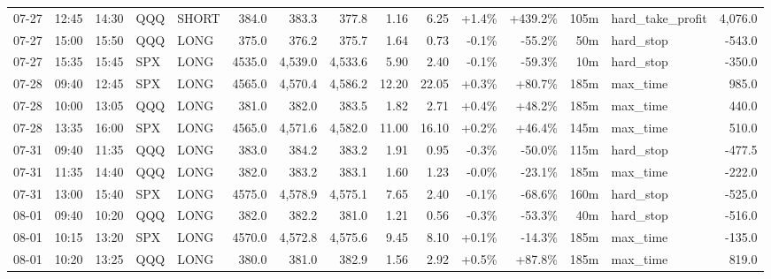 \documentclass[11pt,a4paper,twoside]{article}
\begin{document}
\begin{landscape}
\begin{center}
\begin{longtable}{>{\color{txtmain}}l l l l l r r r r r r r r >{\color{txtmain}}l r}
07-27 & 12:45 & 14:30 & QQQ & SHORT & 384.0 & 383.3 & 377.8 & 1.16 & 6.25 & \textcolor{wingreen}{+1.4\%} & \textcolor{wingreen}{+439.2\%} & 105m & hard\_take\_profit & \textcolor{wingreen}{4,076.0} \\
07-27 & 15:00 & 15:50 & QQQ & LONG & 375.0 & 376.2 & 375.7 & 1.64 & 0.73 & \textcolor{lossred}{-0.1\%} & \textcolor{lossred}{-55.2\%} & 50m & hard\_stop & \textcolor{lossred}{-543.0} \\
07-27 & 15:35 & 15:45 & SPX & LONG & 4535.0 & 4,539.0 & 4,533.6 & 5.90 & 2.40 & \textcolor{lossred}{-0.1\%} & \textcolor{lossred}{-59.3\%} & 10m & hard\_stop & \textcolor{lossred}{-350.0} \\
07-28 & 09:40 & 12:45 & SPX & LONG & 4565.0 & 4,570.4 & 4,586.2 & 12.20 & 22.05 & \textcolor{wingreen}{+0.3\%} & \textcolor{wingreen}{+80.7\%} & 185m & max\_time & \textcolor{wingreen}{985.0} \\
07-28 & 10:00 & 13:05 & QQQ & LONG & 381.0 & 382.0 & 383.5 & 1.82 & 2.71 & \textcolor{wingreen}{+0.4\%} & \textcolor{wingreen}{+48.2\%} & 185m & max\_time & \textcolor{wingreen}{440.0} \\
07-28 & 13:35 & 16:00 & SPX & LONG & 4565.0 & 4,571.6 & 4,582.0 & 11.00 & 16.10 & \textcolor{wingreen}{+0.2\%} & \textcolor{wingreen}{+46.4\%} & 145m & max\_time & \textcolor{wingreen}{510.0} \\
07-31 & 09:40 & 11:35 & QQQ & LONG & 383.0 & 384.2 & 383.2 & 1.91 & 0.95 & \textcolor{lossred}{-0.3\%} & \textcolor{lossred}{-50.0\%} & 115m & hard\_stop & \textcolor{lossred}{-477.5} \\
07-31 & 11:35 & 14:40 & QQQ & LONG & 382.0 & 383.2 & 383.1 & 1.60 & 1.23 & \textcolor{lossred}{-0.0\%} & \textcolor{lossred}{-23.1\%} & 185m & max\_time & \textcolor{lossred}{-222.0} \\
07-31 & 13:00 & 15:40 & SPX & LONG & 4575.0 & 4,578.9 & 4,575.1 & 7.65 & 2.40 & \textcolor{lossred}{-0.1\%} & \textcolor{lossred}{-68.6\%} & 160m & hard\_stop & \textcolor{lossred}{-525.0} \\
08-01 & 09:40 & 10:20 & QQQ & LONG & 382.0 & 382.2 & 381.0 & 1.21 & 0.56 & \textcolor{lossred}{-0.3\%} & \textcolor{lossred}{-53.3\%} & 40m & hard\_stop & \textcolor{lossred}{-516.0} \\
08-01 & 10:15 & 13:20 & SPX & LONG & 4570.0 & 4,572.8 & 4,575.6 & 9.45 & 8.10 & \textcolor{wingreen}{+0.1\%} & \textcolor{lossred}{-14.3\%} & 185m & max\_time & \textcolor{lossred}{-135.0} \\
08-01 & 10:20 & 13:25 & QQQ & LONG & 380.0 & 381.0 & 382.9 & 1.56 & 2.92 & \textcolor{wingreen}{+0.5\%} & \textcolor{wingreen}{+87.8\%} & 185m & max\_time & \textcolor{wingreen}{819.0} \\

\end{longtable}
\end{center}
\end{landscape}
\end{document}
